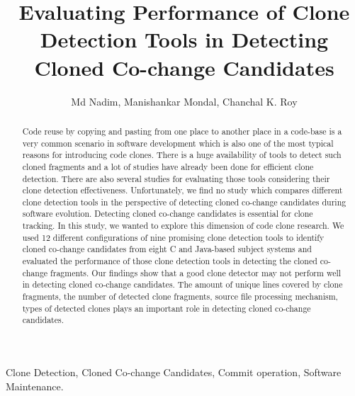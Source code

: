 \documentclass[review]{elsarticle}
\begin{document}
\begin{frontmatter}

\title{Evaluating Performance of Clone Detection Tools in Detecting Cloned Co-change Candidates}

\author{Md Nadim, Manishankar Mondal, Chanchal K. Roy}
\address{Department of Computer Science, University of Saskatchewan, Saskatoon, Canada}

\begin{abstract}
Code reuse by copying and pasting from one place to another place in a code-base is a very common scenario in software development which is also one of the most typical reasons for introducing code clones. There is a huge availability of tools to detect such cloned fragments and a lot of studies have already been done for efficient clone detection. There are also several studies for evaluating those tools considering their clone detection effectiveness. Unfortunately, we find no study which compares different clone detection tools in the perspective of detecting cloned co-change candidates during software evolution. Detecting cloned co-change candidates is essential for clone tracking. In this study, we wanted to explore this dimension of code clone research. We used 12 different configurations of nine promising clone detection tools to identify cloned co-change candidates from eight C and Java-based subject systems and evaluated the performance of those clone detection tools in detecting the cloned co-change fragments. Our findings show that a good clone detector may not perform well in detecting cloned co-change candidates. The amount of unique lines covered by clone fragments, the number of detected clone fragments, source file processing mechanism, types of detected clones plays an important role in detecting cloned co-change candidates. 
\end{abstract}

\begin{keyword}
Clone Detection, Cloned Co-change Candidates, Commit operation, Software Maintenance.
\end{keyword}

\end{frontmatter}
\end{document}
